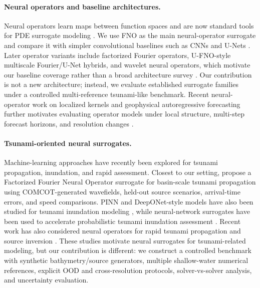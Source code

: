 \paragraph{Neural operators and baseline architectures.}
Neural operators learn maps between function spaces and are now standard tools for PDE surrogate modeling \citep{li2021fno,kovachki2023neuraloperator}. We use FNO as the main neural-operator surrogate and compare it with simpler convolutional baselines such as CNNs and U-Nets \citep{lecun1998gradient,ronneberger2015unet}. Later operator variants include factorized Fourier operators, U-FNO-style multiscale Fourier/U-Net hybrids, and wavelet neural operators, which motivate our baseline coverage rather than a broad architecture survey \citep{tran2023ffno,wen2022ufno,tripura2023wno}. Our contribution is not a new architecture; instead, we evaluate established surrogate families under a controlled multi-reference tsunami-like benchmark. Recent neural-operator work on localized kernels and geophysical autoregressive forecasting further motivates evaluating operator models under local structure, multi-step forecast horizons, and resolution changes \citep{liu2024localized,pathak2022fourcastnet,hu2025spherical}.

\paragraph{Tsunami-oriented neural surrogates.}
Machine-learning approaches have recently been explored for tsunami propagation, inundation, and rapid assessment. Closest to our setting, \citet{kim2026ffno_tsunami} propose a Factorized Fourier Neural Operator surrogate for basin-scale tsunami propagation using COMCOT-generated wavefields, held-out source scenarios, arrival-time errors, and speed comparisons. PINN and DeepONet-style models have also been studied for tsunami inundation modeling \citep{brecht2025pinn_tsunami}, while neural-network surrogates have been used to accelerate probabilistic tsunami inundation assessment \citep{fukutani2025prob_tsunami}. Recent work has also considered neural operators for rapid tsunami propagation and source inversion \citep{someya2026tsunamiNO}. These studies motivate neural surrogates for tsunami-related modeling, but our contribution is different: we construct a controlled benchmark with synthetic bathymetry/source generators, multiple shallow-water numerical references, explicit OOD and cross-resolution protocols, solver-vs-solver analysis, and uncertainty evaluation.

